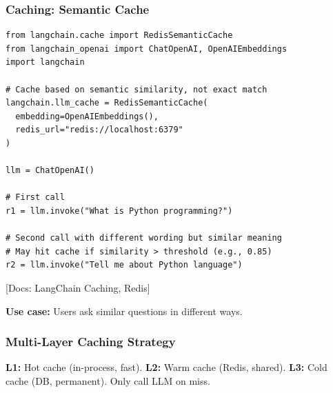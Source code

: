 \documentclass[aspectratio=169,11pt]{beamer}
\newcommand{\docref}[1]{{\scriptsize\color{docgray}[Docs: #1]}}
\begin{document}
\begin{frame}[fragile]
\frametitle{Caching: Semantic Cache}

\begin{lstlisting}
from langchain.cache import RedisSemanticCache
from langchain_openai import ChatOpenAI, OpenAIEmbeddings
import langchain

# Cache based on semantic similarity, not exact match
langchain.llm_cache = RedisSemanticCache(
  embedding=OpenAIEmbeddings(),
  redis_url="redis://localhost:6379"
)

llm = ChatOpenAI()

# First call
r1 = llm.invoke("What is Python programming?")

# Second call with different wording but similar meaning
# May hit cache if similarity > threshold (e.g., 0.85)
r2 = llm.invoke("Tell me about Python language")
\end{lstlisting}
\vspace{-0.15cm}

\docref{LangChain Caching, Redis}

\small\textbf{Use case:} Users ask similar questions in different ways.

\end{frame}

\begin{frame}[shrink=10]
\frametitle{Multi-Layer Caching Strategy}


\vspace{1em}

\begin{tipbox}[Strategy]
  \tiny \textbf{L1:} Hot cache (in-process, fast). \textbf{L2:} Warm cache (Redis, shared). \textbf{L3:} Cold cache (DB, permanent). Only call LLM on miss.
\end{tipbox}

\end{frame}
\end{document}
